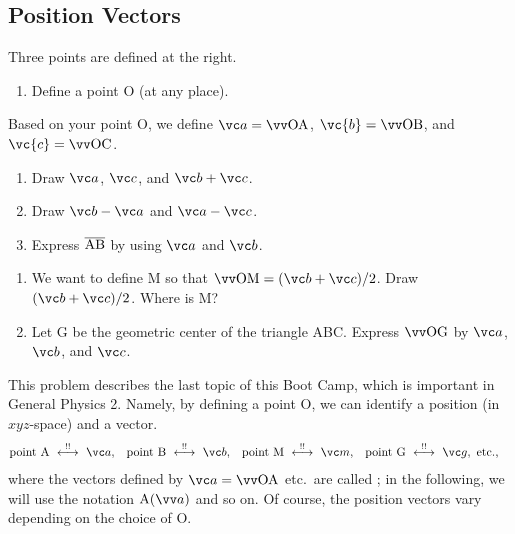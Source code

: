 \documentclass[11pt,pdfa,lastpage]{MishoNote}
\begin{document}
\subsection{Position Vectors}
\begin{problems}
  \Problem[S] Three points are defined at the right.\par
  \noindent\begin{minipage}[b]{0.55\textwidth}
    \begin{enumerate}
      \item Define a point O (at any place).
    \end{enumerate}
    Based on your point O, we define $\vc a=\vvv{OA}$, $\vc{b}=\vvv{OB}$, and $\vc{c}=\vvv{OC}$.
    \begin{enumerate}[resume]
      \item Draw $\vc a$, $\vc c$, and $\vc b+\vc c$.
      \item Draw $\vc b-\vc a$ and $\vc a-\vc c$.
      \item Express $\overline{\mathrm{AB}}$ by using $\vc a$ and $\vc b$.
    \end{enumerate}
  \end{minipage}
    \begin{minipage}[b]{0.35\textwidth}
    \vspace{-1.5em}\par
    \hfill\usebox{\VectorSetB}
    \par\vspace{1em}
  \end{minipage}
\begin{enumerate}[start=5]
  \item We want to define M so that $\vvv{OM}=(\vc b+\vc c)/2$. Draw $(\vc b+\vc c)/2$. Where is M?
  \item Let G be the geometric center of the triangle ABC. Express $\vvv{OG}$ by $\vc a$, $\vc b$, and $\vc c$.
\end{enumerate}
\end{problems}
\noindent
This problem describes the last topic of this Boot Camp, which is important in General Physics 2.
Namely, by defining a point O, we can identify a position (in $xyz$-space) and a vector.
\begin{align*}
&\text{point A}\idrel \vc a,&
&\text{point B}\idrel \vc b,&
&\text{point M}\idrel \vc m,&
&\text{point G}\idrel \vc g, \text{~etc.,}
\end{align*}
where the vectors defined by $\vc a=\vvv{OA}$ etc.\ are called ; in the following, we will use the notation $\posvec Aa$ and so on.
Of course, the position vectors vary depending on the choice of O.
\end{document}

